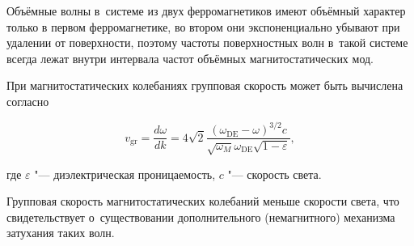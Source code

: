 Объёмные волны в~системе из двух ферромагнетиков имеют объёмный характер только в первом ферромагнетике, во втором они экспоненциально убывают при удалении от поверхности, поэтому частоты поверхностных волн в~такой системе всегда лежат внутри интервала частот объёмных магнитостатических мод.



При магнитостатических колебаниях групповая скорость может быть вычислена согласно \cite{velik:M15}

\begin{equation}

 v _\text{gr} = \frac{d\omega}{dk} = 4 \sqrt 2 \frac{(\omega_\text{DE} - \omega)^{3/2}c}{\sqrt{\omega_M}

\omega_\text{DE} \sqrt{1-\varepsilon}},

\end{equation}

где $\varepsilon$ "--- диэлектрическая проницаемость, $c$ "--- скорость света.

Групповая скорость магнитостатических колебаний меньше скорости света,  что свидетельствует о~существовании дополнительного (немагнитного) механизма затухания таких волн.







